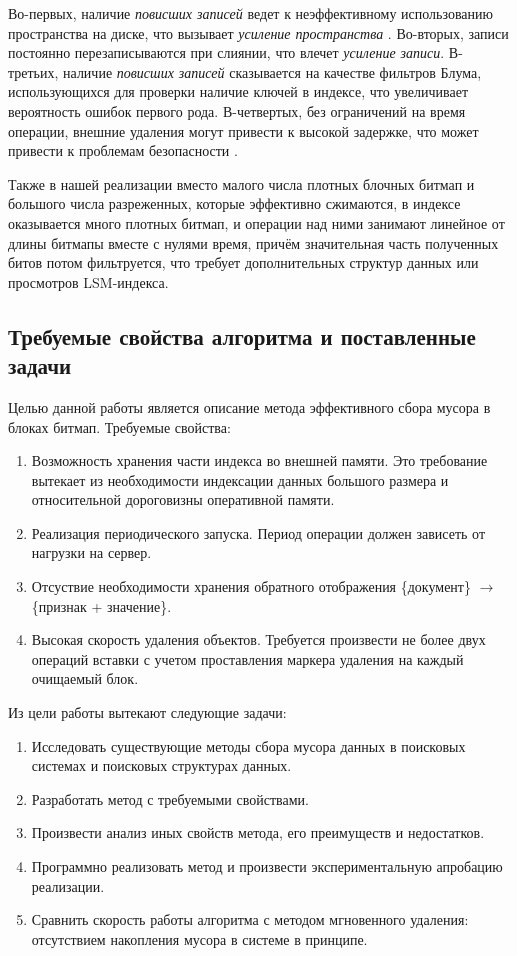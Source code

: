 Во-первых, наличие \textit{повисших записей} ведет к неэффективному использованию
пространства на диске, что вызывает \textit{усиление пространства}
\label{amplification}. Во-вторых, записи постоянно перезаписываются при слиянии,
что влечет \textit{усиление записи}. В-третьих, наличие
\textit{повисших записей} сказывается на качестве фильтров Блума,
использующихся для проверки наличие ключей в индексе, что увеличивает вероятность
ошибок первого рода. В-четвертых, без ограничений на время операции, внешние
удаления могут привести к высокой задержке, что может привести
к проблемам безопасности \cite{Lethe:2020}.

Также в нашей реализации вместо малого числа плотных блочных битмап и
большого числа разреженных, которые эффективно сжимаются, в индексе оказывается
много плотных битмап, и операции над ними занимают линейное от длины битмапы
вместе с нулями время, причём значительная часть полученных битов потом
фильтруется, что требует дополнительных структур данных или просмотров LSM-индекса.

\subsection{Требуемые свойства алгоритма и поставленные задачи}

Целью данной работы является описание метода эффективного сбора мусора в блоках
битмап. Требуемые свойства:
\begin{enumerate}
    \item Возможность хранения части индекса во внешней памяти. Это требование вытекает
    из необходимости индексации данных большого размера и относительной дороговизны
    оперативной памяти.
    \item Реализация периодического запуска. Период операции должен зависеть от нагрузки 
    на сервер.
    \item Отсуствие необходимости хранения обратного отображения \{документ\} $\rightarrow$
    \{признак + значение\}.
    \item Высокая скорость удаления объектов. Требуется произвести не более двух операций
    вставки с учетом проставления маркера удаления на каждый очищаемый блок.
\end{enumerate}

Из цели работы вытекают следующие задачи:
\begin{enumerate}
    \item Исследовать существующие методы сбора мусора данных в поисковых системах
    и поисковых структурах данных.
    \item Разработать метод с требуемыми свойствами.
    \item Произвести анализ иных свойств метода, его преимуществ и недостатков.
    \item Программно реализовать метод и произвести экспериментальную апробацию реализации. 
    \item Сравнить скорость работы алгоритма с методом мгновенного удаления: отсутствием накопления
    мусора в системе в принципе.
\end{enumerate}